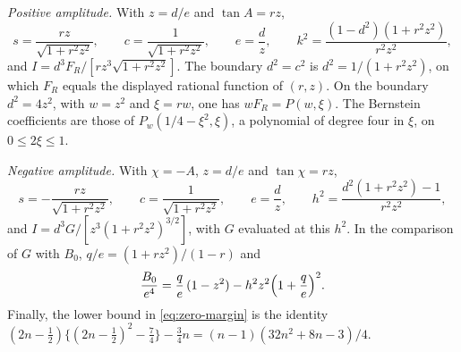 \documentclass[11pt,a4paper]{article}
\theoremstyle{remark}\newtheorem{remark}[theorem]{Remark}
\begin{document}
\emph{Positive amplitude.} With $z=d/e$ and $\tan A=rz$,
\[
 s=\frac{rz}{\sqrt{1+r^2z^2}},\qquad c=\frac1{\sqrt{1+r^2z^2}},\qquad
 e=\frac dz,\qquad k^2=\frac{(1-d^2)(1+r^2z^2)}{r^2z^2},
\]
and $I=d^3F_R/[rz^3\sqrt{1+r^2z^2}]$. The boundary $d^2=c^2$ is
$d^2=1/(1+r^2z^2)$, on which $F_R$ equals the displayed rational
function of $(r,z)$. On the boundary $d^2=4z^2$, with $w=z^2$ and
$\xi=rw$, one has $wF_R=P(w,\xi)$. The Bernstein coefficients are those
of $P_w(1/4-\xi^2,\xi)$, a polynomial of degree four in $\xi$, on
$0\le2\xi\le1$.

\emph{Negative amplitude.} With $\chi=-A$, $z=d/e$ and $\tan\chi=rz$,
\[
 s=-\frac{rz}{\sqrt{1+r^2z^2}},\qquad c=\frac1{\sqrt{1+r^2z^2}},\qquad
 e=\frac dz,\qquad h^2=\frac{d^2(1+r^2z^2)-1}{r^2z^2},
\]
and $I=d^3G/[z^3(1+r^2z^2)^{3/2}]$, with $G$ evaluated at this $h^2$.
In the comparison of $G$ with $B_0$, $q/e=(1+rz^2)/(1-r)$ and
\[
 \frac{B_0}{e^4}=\frac qe\,(1-z^2)-h^2z^2\Bigl(1+\frac qe\Bigr)^2 .
\]
Finally, the lower bound in \eqref{eq:zero-margin} is the identity
$(2n-\tfrac12)\{(2n-\tfrac12)^2-\tfrac74\}-\tfrac34n
=(n-1)(32n^2+8n-3)/4$.
\end{document}
